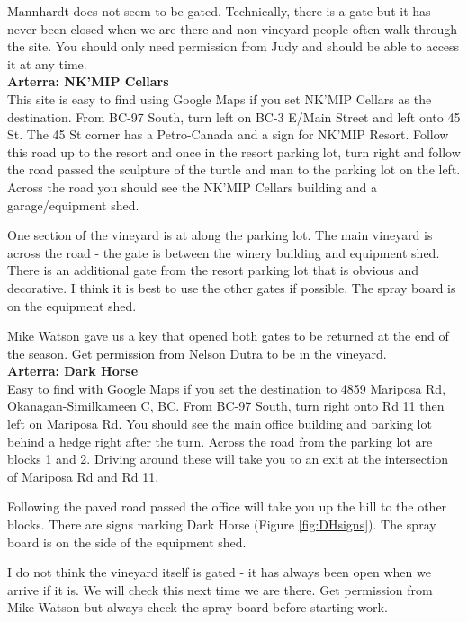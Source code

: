 \documentclass[11pt,letter]{article}
\begin{document}
Mannhardt does not seem to be gated. Technically, there is a gate but it has never been closed when we are there and non-vineyard people often walk through the site. You should only need permission from Judy and should be able to access it at any time. \\

{\bf Arterra: NK'MIP Cellars} \\
This site is easy to find using Google Maps if you set NK'MIP Cellars as the destination.
From BC-97 South, turn left on BC-3 E/Main Street and left onto 45 St. The 45 St corner has a Petro-Canada and a sign for NK'MIP Resort. Follow this road up to the resort and once in the resort parking lot, turn right and follow the road passed the sculpture of the turtle and man to the parking lot on the left. Across the road you should see the NK'MIP Cellars building and a garage/equipment shed. 

One section of the vineyard is at along the parking lot. The main vineyard is across the road - the gate is between the winery building and equipment shed. There is an additional gate from the resort parking lot that is obvious and decorative. I think it is best to use the other gates if possible. The spray board is on the equipment shed.

Mike Watson gave us a key that opened both gates to be returned at the end of the season. Get permission from Nelson Dutra to be in the vineyard. \\

{\bf Arterra: Dark Horse} \\
Easy to find with Google Maps if you set the destination to 4859 Mariposa Rd, Okanagan-Similkameen C, BC.
From BC-97 South, turn right onto Rd 11 then left on Mariposa Rd. You should see the main office building and parking lot behind a hedge right after the turn. Across the road from the parking lot are blocks 1 and 2. Driving around these will take you to an exit at the intersection of Mariposa Rd and Rd 11.

Following the paved road passed the office will take you up the hill to the other blocks. There are signs marking Dark Horse (Figure  \ref{fig:DHsigns}). The spray board is on the side of the equipment shed.

I do not think the vineyard itself is gated - it has always been open when we arrive if it is. We will check this next time we are there. Get permission from Mike Watson but always check the spray board before starting work. \\
\end{document}
